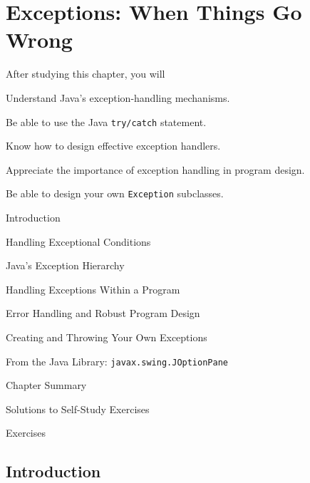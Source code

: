 
\setcounter{SSTUDYcount}{1}
\setcounter{chapter}{9}
\chapter{Exceptions: When Things Go Wrong}
\label{chapter-exceptions}



\CObegin
{}
\label{objectives}
\noindent After studying this chapter, you will

\begin{COBL}
\item  Understand Java's exception-handling mechanisms.
\item  Be able to use the Java {\tt try/catch} statement.
\item  Know how to design effective exception handlers.
\item  Appreciate the importance of exception handling
in program design.
\item  Be able to design your own {\tt Exception} subclasses.
\end{COBL}

\label{outline}
\begin{COL}
\item {Introduction}
\item {Handling Exceptional Conditions}
\item {Java's Exception Hierarchy}
\item {Handling Exceptions Within a Program}
\item {Error Handling and Robust Program Design}
\item {Creating and Throwing Your Own Exceptions}
\item {From the Java Library: {\tt javax.swing.JOptionPane}}
\par\small\item[] {Chapter Summary}
\par\small\item[] {Solutions to Self-Study Exercises}
\par\small\item[] {Exercises}
\end{COL}
\COend


\section{Introduction}
\label{introduction}

